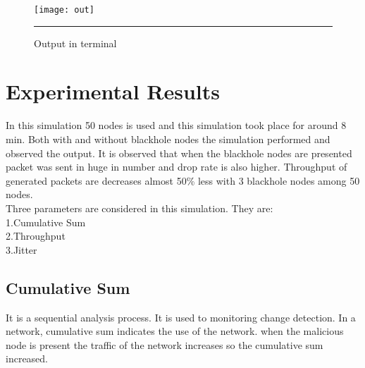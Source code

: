 \begin{figure}[htbp]
	\centering
	\texttt{[image: out]}
	\rule{35em}{0.5pt}
	\caption[Output in terminal]{Output in terminal}
	\label{fig:terminal}
\end{figure}
\pagebreak
\section{Experimental Results}
In this simulation 50 nodes is used and this simulation took place for around 8 min.
Both with and without blackhole nodes the simulation performed and observed the output.
It is observed that when the blackhole nodes are presented packet was sent in huge in number and drop rate is also higher. Throughput of generated packets are decreases almost 50\% less with 3 blackhole nodes among 50 nodes.\\

Three parameters are considered in this simulation.
They are:\\
1.Cumulative Sum\\
2.Throughput\\
3.Jitter
\subsection{Cumulative Sum}
It is a sequential analysis process. It is used to monitoring change detection. In a network, cumulative sum indicates the use of the network. when the malicious node is present the traffic of the network increases so the cumulative sum increased. \cite{gao2020cumulative}


